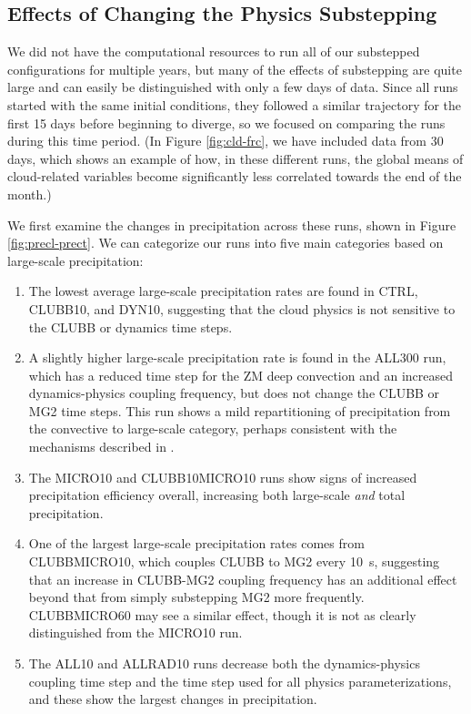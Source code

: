 \documentclass [11pt, proquest] {uwthesis}[2020/02/24]
\begin{document}
\subsection{Effects of Changing the Physics Substepping}

We did not have the computational resources to run all of our substepped configurations for multiple years, but many of the effects of substepping are quite large and can easily be distinguished with only a few days of data. Since all runs started with the same initial conditions, they followed a similar trajectory for the first \num{15} days before beginning to diverge, so we focused on comparing the runs during this time period. (In Figure \ref{fig:cld-frc}, we have included data from \num{30} days, which shows an example of how, in these different runs, the global means of cloud-related variables become significantly less correlated towards the end of the month.)

We first examine the changes in precipitation across these runs, shown in Figure \ref{fig:precl-prect}. We can categorize our runs into five main categories based on large-scale precipitation:

\begin{enumerate}
\item The lowest average large-scale precipitation rates are found in CTRL, CLUBB10, and DYN10, suggesting that the cloud physics is not sensitive to the CLUBB or dynamics time steps.
\item A slightly higher large-scale precipitation rate is found in the ALL300 run, which has a reduced time step for the ZM deep convection and an increased dynamics-physics coupling frequency, but does not change the CLUBB or MG2 time steps. This run shows a mild repartitioning of precipitation from the convective to large-scale category, perhaps consistent with the mechanisms described in \textcite{Williamson2013}.
\item The MICRO10 and CLUBB10MICRO10 runs show signs of increased precipitation efficiency overall, increasing both large-scale \emph{and} total precipitation.
\item One of the largest large-scale precipitation rates comes from CLUBBMICRO10, which couples CLUBB to MG2 every \SI{10}{\second}, suggesting that an increase in CLUBB-MG2 coupling frequency has an additional effect beyond that from simply substepping MG2 more frequently. CLUBBMICRO60 may see a similar effect, though it is not as clearly distinguished from the MICRO10 run.
\item The ALL10 and ALLRAD10 runs decrease both the dynamics-physics coupling time step and the time step used for all physics parameterizations, and these show the largest changes in precipitation.
\end{enumerate}
\end{document}
